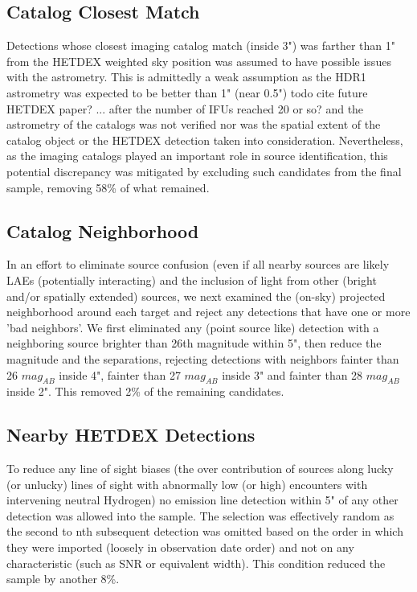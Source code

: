 \documentclass{aastex62}
\begin{document}
\subsection{Catalog Closest Match}
Detections whose closest imaging catalog match (inside 3") was farther than 1" from the HETDEX weighted sky position was assumed to have possible issues with the astrometry. This is admittedly a weak assumption as the HDR1 astrometry was expected to be better than 1" (near 0.5") {\color{red} todo cite future HETDEX paper? ... after the number of IFUs reached 20 or so?} and the astrometry of the catalogs was not verified nor was the spatial extent of the catalog object or the HETDEX detection taken into consideration. Nevertheless, as the imaging catalogs played an important role in source identification, this potential discrepancy was mitigated by excluding such candidates from the final sample, removing 58\% of what remained.


\subsection{Catalog Neighborhood}  \label{sec:catalog_neighbors}
In an effort to eliminate source confusion (even if all nearby sources are likely LAEs (potentially interacting) and the inclusion of light from other (bright and/or spatially extended) sources, we next examined the (on-sky) projected neighborhood around each target and reject any detections that have one or more 'bad neighbors'. We first eliminated any (point source like) detection with a neighboring source brighter than 26th magnitude within 5", then reduce the magnitude and the separations, rejecting detections with neighbors fainter than 26 $mag_{AB}$ inside 4", fainter than 27 $mag_{AB}$ inside 3" and fainter than 28 $mag_{AB}$ inside 2". This removed 2\% of the remaining candidates.


\subsection{Nearby HETDEX Detections}
To reduce any line of sight biases (the over contribution of sources along lucky (or unlucky) lines of sight with abnormally low (or high) encounters with intervening neutral Hydrogen) no emission line detection within 5" of any other detection was allowed into the sample. The selection was effectively random as the second to nth subsequent detection was omitted based on the order in which they were imported (loosely in observation date order) and not on any characteristic (such as SNR or equivalent width). This condition reduced the sample by another 8\%.\\
\end{document}
